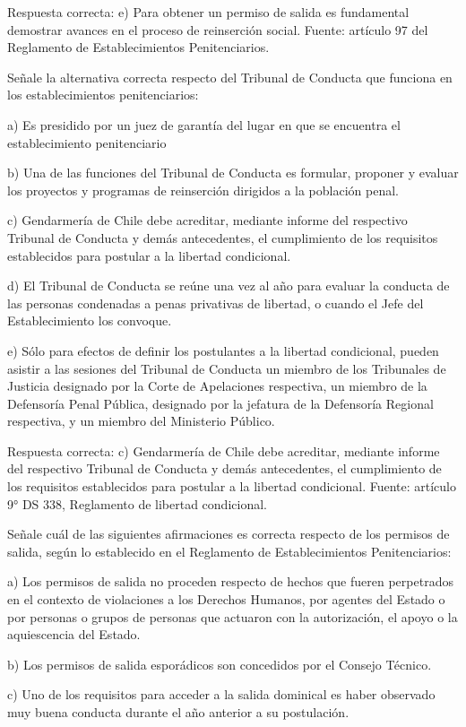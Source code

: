 \documentclass[letterpaper, 11pt]{article}
\begin{document}
Respuesta correcta:
e) Para obtener un permiso de salida es fundamental demostrar
avances en el proceso de reinserción social.
Fuente: artículo 97 del Reglamento de Establecimientos Penitenciarios.

Señale la alternativa correcta respecto del Tribunal de Conducta que funciona en los
establecimientos penitenciarios:

a) Es presidido por un juez de garantía del lugar en que se encuentra el establecimiento
penitenciario

b) Una de las funciones del Tribunal de Conducta es formular, proponer y evaluar los
proyectos y programas de reinserción dirigidos a la población penal.

c) Gendarmería de Chile debe acreditar, mediante informe del respectivo Tribunal de
Conducta y demás antecedentes, el cumplimiento de los requisitos establecidos para
postular a la libertad condicional.

d) El Tribunal de Conducta se reúne una vez al año para evaluar la conducta de las personas
condenadas a penas privativas de libertad, o cuando el Jefe del Establecimiento los
convoque.

e) Sólo para efectos de definir los postulantes a la libertad condicional, pueden asistir a las
sesiones del Tribunal de Conducta un miembro de los Tribunales de Justicia designado por
la Corte de Apelaciones respectiva, un miembro de la Defensoría Penal Pública, designado
por la jefatura de la Defensoría Regional respectiva, y un miembro del Ministerio Público.

Respuesta correcta:
c) Gendarmería de Chile debe acreditar, mediante informe del
respectivo Tribunal de Conducta y demás antecedentes, el cumplimiento de los requisitos
establecidos para postular a la libertad condicional.
Fuente: artículo 9° DS 338, Reglamento de libertad condicional.

Señale cuál de las siguientes afirmaciones es correcta respecto de los permisos de salida,
según lo establecido en el Reglamento de Establecimientos Penitenciarios:

a) Los permisos de salida no proceden respecto de hechos que fueren perpetrados en el
contexto de violaciones a los Derechos Humanos, por agentes del Estado o por personas o
grupos de personas que actuaron con la autorización, el apoyo o la aquiescencia del Estado.

b) Los permisos de salida esporádicos son concedidos por el Consejo Técnico.

c) Uno de los requisitos para acceder a la salida dominical es haber observado muy buena
conducta durante el año anterior a su postulación.
\end{document}
